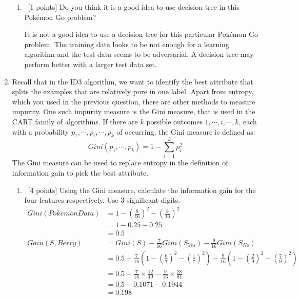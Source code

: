 \begin{enumerate}
\begin{enumerate}
\item   ~[1 points]  Do you think it is a good idea to use decision tree in this Pok\'emon Go problem?

It is not a good idea to use a decision tree for this particular Pok\'emon Go problem. The training data looks to be not enough for a learning algorithm and the test data seems to be adversarial. A decision tree may perform better with a larger test data set.

\end{enumerate}
\item Recall that in the ID3 algorithm, we want to identify the best
  attribute that splits the examples that are relatively pure in one
  label. Apart from entropy, which you used in the previous question,
  there are other methods to measure impurity. One such impurity
  measure is the Gini measure, that is used in the CART family of
  algorithms. If there are $k$ possible outcomes
  $1,\cdots, i, \cdots, k$, each with a probability
  $p_1, \cdots, p_i, \cdots, p_k$ of occurring, the Gini measure is
  defined as:
\begin{equation*}
Gini(p_1, \cdots, p_k) =   1 - \sum_{i=1}^k p_i^2
\end{equation*}
The Gini measure can be used to replace entropy in the definition of information gain to pick the best attribute.
\begin{enumerate}
\item ~[4 points] Using the Gini measure, calculate the information gain for the four features respectively. Use 3 significant digits. \\
\begin{align*} 
Gini(Pok\acute emon Data) &= 1 - \left ( \frac{8}{16} \right ) ^ 2 - \left ( \frac{8}{16} \right ) ^ 2\\
&= 1 - 0.25 - 0.25\\
&= 0.5\\
Gain(S, Berry) &= Gini(S) -\frac{7}{16} Gini(S_{Yes}) -\frac{9}{16} Gini(S_{No}) \\
&= 0.5 - \frac{7}{16} \left( 1 - \left( \frac{6}{7} \right) ^2 - \left( \frac{1}{7} \right) ^2 \right) - \frac{9}{16} \left( 1 - \left( \frac{2}{9} \right) ^2 - \left( \frac{7}{9} \right) ^2 \right) \\
&= 0.5 - \frac{7}{16} \times \frac{12}{49}  - \frac{9}{16} \times \frac{28}{81} \\
&= 0.5 - 0.1071 - 0.1944\\
&=0.198
\end{align*}
\begin{align*} 

\end{align*}
\end{enumerate}
\end{enumerate}
